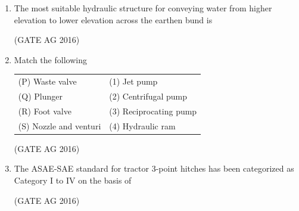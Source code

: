 \documentclass[journal]{IEEEtran}
\begin{document}
\begin{enumerate}
\medskip

\item 
The most suitable hydraulic structure for conveying water from higher elevation to lower elevation across the earthen bund is

\begin{enumerate}
\end{enumerate}
\hfill(GATE AG 2016)\\

\medskip

\item 
Match the following

\begin{tabular}{ll}
(P) Waste valve          & (1) Jet pump \\
(Q) Plunger              & (2) Centrifugal pump \\
(R) Foot valve           & (3) Reciprocating pump \\
(S) Nozzle and venturi   & (4) Hydraulic ram \\
\end{tabular}

\begin{enumerate}
\end{enumerate}
\hfill(GATE AG 2016)\\

\medskip

\item 
The ASAE-SAE standard for tractor 3-point hitches has been categorized as Category I to IV on the basis of

\begin{enumerate}
\end{enumerate}
\hfill(GATE AG 2016)\\


\end{enumerate}
\end{document}
